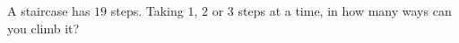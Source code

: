 A staircase has $19$ steps. Taking $1$, $2$ or $3$ steps at a time, in how many ways can you climb it?
